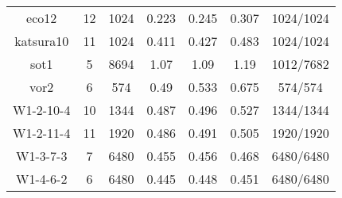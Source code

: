 \documentclass[12pt]{article}
\begin{document}
\begin{table}[H]
\begin{center}
\begin{tabular}{c|c|c|c|c|c|c}
eco12&12 &1024&0.223&0.245&0.307&1024/1024\\
katsura10&11 &1024&0.411&0.427&0.483&1024/1024\\
sot1&5 &8694&1.07&1.09&1.19 & 1012/7682\\
vor2&6 &574&0.49&0.533&0.675&574/574\\
W1-2-10-4&10 &1344&0.487&0.496&0.527&1344/1344\\
W1-2-11-4&11 &1920&0.486&0.491&0.505&1920/1920\\
W1-3-7-3&7 &6480&0.455&0.456&0.468&6480/6480\\
W1-4-6-2&6 &6480&0.445&0.448&0.451&6480/6480
\end{tabular}
       \end{center}
\end{table}




\end{document}
